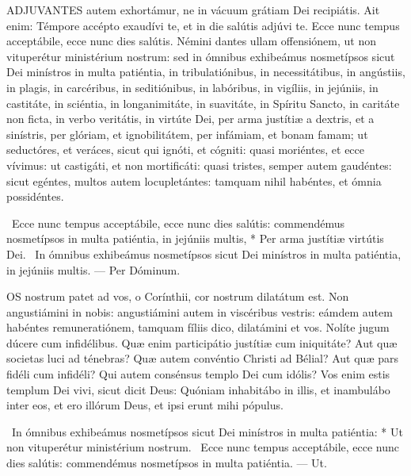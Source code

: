


\lettrine[lines=2]{A}{DJUVANTES} autem exhortámur, ne in vácuum grátiam Dei recipiátis. Ait enim: Témpore accépto exaudívi te, et in die salútis adjúvi te. Ecce nunc tempus acceptábile, ecce nunc dies salútis. Némini dantes ullam offensiónem, ut non vituperétur ministérium nostrum: sed in ómnibus exhibeámus nosmetípsos sicut Dei minístros in multa patiéntia, in tribulatiónibus, in necessitátibus, in angústiis, in plagis, in carcéribus, in seditiónibus, in labóribus, in vigíliis, in jejúniis, in castitáte, in sciéntia, in longanimitáte, in suavitáte, in Spíritu Sancto, in caritáte non ficta, in verbo veritátis, in virtúte Dei, per arma justítiæ a dextris, et a sinístris, per glóriam, et ignobilitátem, per infámiam, et bonam famam; ut seductóres, et veráces, sicut qui ignóti, et cógniti: quasi moriéntes, et ecce vívimus: ut castigáti, et non mortificáti: quasi tristes, semper autem gaudéntes: sicut egéntes, multos autem locupletántes: tamquam nihil habéntes, et ómnia possidéntes.

\R\ Ecce nunc tempus acceptábile, ecce nunc dies salútis: commendémus nosmetípsos in multa patiéntia, in jejúniis multis, * Per arma justítiæ virtútis Dei. \V\ In ómnibus exhibeámus nosmetípsos sicut Dei minístros in multa patiéntia, in jejúniis multis. --- Per Dóminum.


\lettrine[lines=2]{O}{S} nostrum patet ad vos, o Corínthii, cor nostrum dilatátum est. Non angustiámini in nobis: angustiámini autem in viscéribus vestris: eámdem autem habéntes remuneratiónem, tamquam fíliis dico, dilatámini et vos. Nolíte jugum dúcere cum infidélibus. Quæ enim participátio justítiæ cum iniquitáte? Aut quæ societas luci ad ténebras? Quæ autem convéntio Christi ad Bélial? Aut quæ pars fidéli cum infidéli? Qui autem consénsus templo Dei cum idólis? Vos enim estis templum Dei vivi, sicut dicit Deus: Quóniam inhabitábo in illis, et inambulábo inter eos, et ero illórum Deus, et ipsi erunt mihi pópulus.

\R\ In ómnibus exhibeámus nosmetípsos sicut Dei minístros in multa patiéntia: * Ut non vituperétur ministérium nostrum. \V\ Ecce nunc tempus acceptábile, ecce nunc dies salútis: commendémus nosmetípsos in multa patiéntia. --- Ut.

